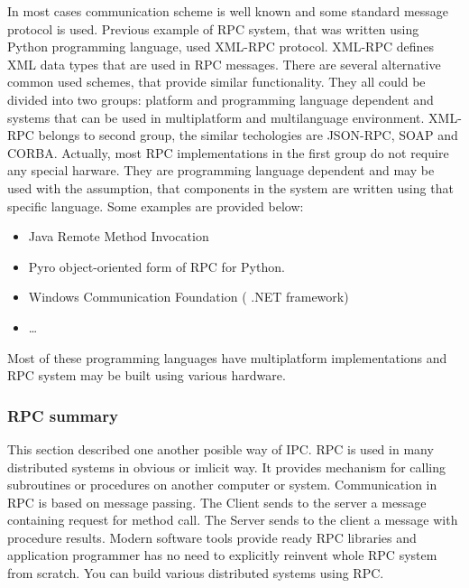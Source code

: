 In most cases communication scheme is well known and some standard
message protocol is used. Previous example of RPC system, that was written using
Python programming language, used XML-RPC protocol. XML-RPC defines XML data
types that are used in RPC messages. There are several alternative common used
schemes, that provide similar functionality. They all could be divided into
two groups: platform and programming language dependent and systems that  
can be used in multiplatform and multilanguage environment. XML-RPC belongs to
second group, the similar techologies are JSON-RPC, SOAP and CORBA.
Actually, most RPC implementations in the first group do not require any special
harware. They are programming language dependent and may be used with
the assumption, that components in the system are written using that specific
language. Some examples are provided below:
\begin{itemize}
  \item Java Remote Method Invocation
  \item Pyro object-oriented form of RPC for Python.
  \item Windows Communication Foundation ( .NET framework)
  \item \ldots   
\end{itemize} 
Most of these programming languages have multiplatform implementations and RPC
system may be built using various hardware.
  
\subsubsection{RPC summary}
This section described one another posible way of \gls{IPC}. RPC is used in many
distributed systems in obvious or imlicit way. It provides mechanism for calling 
subroutines or procedures on another computer or system. 
Communication in RPC is based on message passing.
The Client sends to the server a message containing request for method call.
The Server sends to the client a message with procedure results.
Modern software tools provide ready RPC libraries and application programmer has no need to explicitly reinvent whole RPC system from scratch.
You can build various distributed systems using RPC.
 


